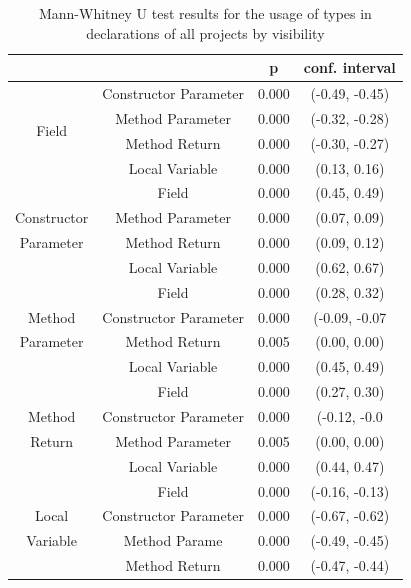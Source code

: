 \documentclass[preprint]{sigplanconf}
\begin{document}
\begin{table}[ht]

\centering{}%
\renewcommand{\arraystretch}{1.2}

\begin{tabular}{|c|c|c|c|}
\hline 
								& {}					& p  	      & conf. interval\\
\hline
\hline
\multirow{4}{*}{Field}				& Constructor Parameter	& 0.000 & (-0.49, -0.45)\\
								& Method Parameter	& 0.000 & (-0.32, -0.28)\\
								& Method Return		& 0.000 & (-0.30, -0.27)\\
								& Local Variable 		& 0.000 & (0.13, 0.16)\\
\hline
{}								& Field				& 0.000 & (0.45, 0.49)	\\
Constructor						& Method Parameter	& 0.000 & (0.07, 0.09)	\\
Parameter							& Method Return		& 0.000 & (0.09, 0.12)	\\
{}								& Local Variable		& 0.000 & (0.62, 0.67)	\\
\hline
{}								& Field				& 0.000 & (0.28, 0.32)	\\
Method							& Constructor Parameter	& 0.000 & (-0.09, -0.07	\\
Parameter							& Method Return		& 0.005 & (0.00, 0.00)	\\
{}								& Local Variable		& 0.000 & (0.45, 0.49)	\\
\hline
{}								& Field				& 0.000 & (0.27, 0.30)	\\
Method							& Constructor Parameter	& 0.000 & (-0.12, -0.0	\\
Return							& Method Parameter	& 0.005 & (0.00, 0.00)	\\
{}								& Local Variable		& 0.000 & (0.44, 0.47)	\\
\hline
{}								& Field				& 0.000 & (-0.16, -0.13) \\
Local							& Constructor Parameter	& 0.000 & (-0.67, -0.62) \\
Variable							& Method Parame		& 0.000 & (-0.49, -0.45) \\
{}								& Method Return		& 0.000 & (-0.47, -0.44) \\
\hline  
\end{tabular}
\label{tab:all_utest_type}
\caption{Mann-Whitney U test results for the usage of types in declarations of all projects by visibility}
\end{table}
\end{document}
